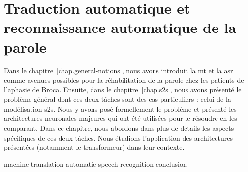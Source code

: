 \chapter{Traduction automatique et reconnaissance automatique de la parole}
\label{chap.mt-and-asr}

Dans le chapitre~\ref{chap.general-notions}, 
nous avons introduit la \gls{mt} et la \gls{asr} comme avenues possibles 
pour la réhabilitation de la parole chez les patients de l'aphasie de Broca.
Ensuite, dans le chapitre~\ref{chap.s2s}, nous avons présenté le problème général
dont ces deux tâches sont des cas particuliers : celui de la modélisation \gls{s2s}.
Nous y avons posé formellement le problème 
et présenté les architectures neuronales majeures qui ont été utilisées pour le résoudre en les comparant.
Dans ce chapitre, nous abordons dans plus de détails les aspects spécifiques de ces deux tâches.
Nous étudions l'application des architectures présentées (notamment le transformeur) dans leur contexte.

{machine-translation}
{automatic-speech-recognition}
{conclusion}
